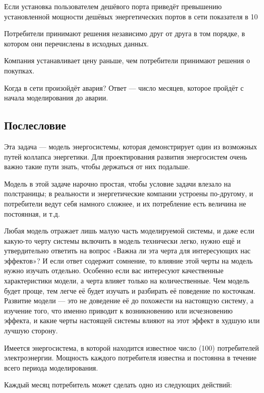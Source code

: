 Если установка пользователем дешёвого порта приведёт превышению установленной мощности дешёвых энергетических портов в сети показателя в 10%

Потребители принимают решения независимо друг от друга в том порядке, в котором они перечислены в исходных данных.

Компания устанавливает цену раньше, чем потребители принимают решения о покупках.

Когда в сети произойдёт авария? Ответ — число месяцев, которое пройдёт с начала моделирования до аварии.

\subsection*{Послесловие}

Эта задача — модель энергосистемы, которая демонстрирует один из возможных путей коллапса энергетики. Для проектирования развития энергосистем очень важно такие пути знать, чтобы держаться от них подальше.

Модель в этой задаче нарочно простая, чтобы условие задачи влезало на полстраницы; в реальности и энергетические компании устроены по-другому, и потребители ведут себя намного сложнее, и их потребление есть величина не постоянная, и т.д.

Любая модель отражает лишь малую часть моделируемой системы, и даже если какую-то черту системы включить в модель технически легко, нужно ещё и утвердительно ответить на вопрос «Важна ли эта черта для интересующих нас эффектов»? И если ответ содержит сомнение, то влияние этой черты на модель нужно изучать отдельно. Особенно если вас интересуют качественные характеристики модели, а черта влияет только на количественные. Чем модель будет проще, тем легче её будет изучать и разбирать её поведение по косточкам. Развитие модели — это не доведение её до похожести на настоящую систему, а изучение того, что именно приводит к возникновению или исчезновению эффекта, и какие черты настоящей системы влияют на этот эффект в худшую или лучшую сторону.

Имеется энергосистема, в которой находится известное число (100) потребителей электроэнергии.
Мощность каждого потребителя известна и постоянна в течение всего периода моделирования.

Каждый месяц потребитель может сделать одно из следующих действий:

